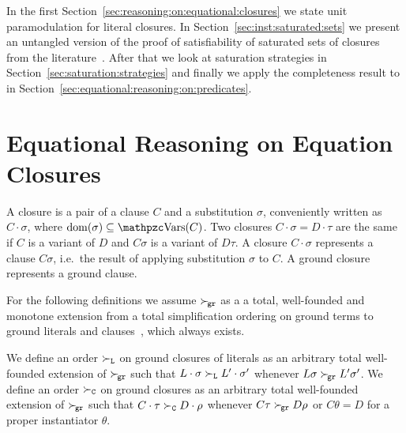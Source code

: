 In the first Section~\vref{sec:reasoning:on:equational:closures}
we state unit paramodulation for literal closures.
In Section~\vref{sec:inst:saturated:sets} we present
an untangled version of the proof of satisfiability
of saturated sets of closures
from the literature~\cite{GK2004csl}.
After that we look at saturation strategies in
Section~\vref{sec:saturation:strategies}
and finally we apply the completeness result to \InstGenEQ{}
in Section~\vref{sec:equational:reasoning:on:predicates}.



\section{Equational Reasoning on Equation Closures}\label{sec:reasoning:on:equational:closures}

\begin{definition}
    A closure is a pair of a clause \( C \) and a substitution \( \sigma \),
    conveniently written as \( C\cdot\sigma \), where \( \domain(\sigma) \subseteq \var(C)\). 
    Two closures \( C\cdot\sigma = D\cdot\tau \)
    are the same if \( C \) is a variant of \( D \) and \( C\sigma \) is a variant of \( D\tau \).
    A closure \( C\cdot\sigma \) represents a clause \( C\sigma \),
    i.e.~the result of applying substitution \( \sigma \) to \( C \).
    A ground closure represents a ground clause.
\end{definition}

For the following definitions we assume
\( \mathrel\succ_{\!\mathtt{gr}} \) as a a total, well-founded and monotone extension
from a total simplification ordering on ground terms
to ground literals and clauses~\cite{NR2001},
which always exists.


\begin{definition}
    We define an order \( \mathrel\succ_{\mathtt{L}} \) on ground closures of literals
    as an arbitrary total well-founded extension of \( \mathrel\succ_{\!\mathtt{gr}} \)
    such that
    \( L\cdot\sigma\mathrel\succ_{\mathtt{L}} L'\cdot\sigma' \) whenever
    \( L\sigma\mathrel\succ_{\!\mathtt{gr}} L'\sigma' \).
% 
    We define an order \( \mathrel\succ_{\mathtt{C}} \) on ground closures
    as an arbitrary total well-founded extension of
    \( \mathrel\succ_{\!\mathtt{gr}} \)
    such that
    \( C\cdot\tau\mathrel\succ_{\mathtt{C}} D\cdot\rho \) whenever
    \( C\tau\mathrel\succ_{\!\mathtt{gr}} D\rho \) or \( C\theta = D \) for a proper instantiator \( \theta \).
\end{definition}

